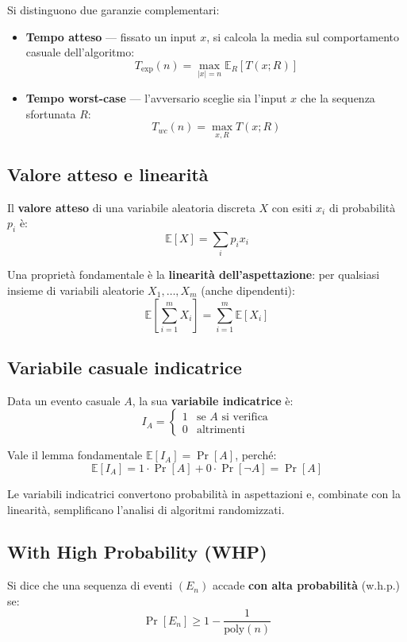 \documentclass[12pt, a4paper]{article}
\begin{document}
Si distinguono due garanzie complementari:

\begin{itemize}
    \item \textbf{Tempo atteso} — fissato un input $x$, si calcola la media sul 
    comportamento casuale dell'algoritmo:
    $$T_{\exp}(n) = \max_{|x|=n} \mathbb{E}_R[T(x; R)]$$
    
    \item \textbf{Tempo worst-case} — l'avversario sceglie sia l'input $x$ che la 
    sequenza sfortunata $R$:
    $$T_{wc}(n) = \max_{x, R} T(x; R)$$
\end{itemize}

\subsection*{Valore atteso e linearità}

Il \textbf{valore atteso} di una variabile aleatoria discreta $X$ con esiti $x_i$ 
di probabilità $p_i$ è:
$$\mathbb{E}[X] = \sum_i p_i x_i$$

Una proprietà fondamentale è la \textbf{linearità dell'aspettazione}: per qualsiasi 
insieme di variabili aleatorie $X_1, \ldots, X_m$ (anche dipendenti):
$$\mathbb{E}\left[\sum_{i=1}^m X_i\right] = \sum_{i=1}^m \mathbb{E}[X_i]$$

\subsection*{Variabile casuale indicatrice}

Data un evento casuale $A$, la sua \textbf{variabile indicatrice} è:
$$I_A = \begin{cases} 1 & \text{se } A \text{ si verifica} \\ 0 & \text{altrimenti} \end{cases}$$

Vale il lemma fondamentale $\mathbb{E}[I_A] = \Pr[A]$, perché:
$$\mathbb{E}[I_A] = 1 \cdot \Pr[A] + 0 \cdot \Pr[\neg A] = \Pr[A]$$

Le variabili indicatrici convertono probabilità in aspettazioni e, combinate con 
la linearità, semplificano l'analisi di algoritmi randomizzati.

\subsection*{With High Probability (WHP)}

Si dice che una sequenza di eventi $(E_n)$ accade \textbf{con alta probabilità} (w.h.p.) se:
$$\Pr[E_n] \geq 1 - \frac{1}{\text{poly}(n)}$$
\end{document}
